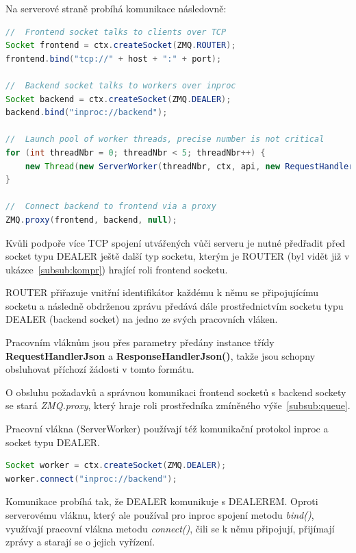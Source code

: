 \documentclass[thesis=M,czech]{FITthesis}[2014/05/07]
\begin{document}
Na serverové straně probíhá komunikace následovně: 

\begin{lstlisting}[language=java]
//  Frontend socket talks to clients over TCP
Socket frontend = ctx.createSocket(ZMQ.ROUTER);
frontend.bind("tcp://" + host + ":" + port);

//  Backend socket talks to workers over inproc
Socket backend = ctx.createSocket(ZMQ.DEALER);
backend.bind("inproc://backend");

//  Launch pool of worker threads, precise number is not critical
for (int threadNbr = 0; threadNbr < 5; threadNbr++) {
    new Thread(new ServerWorker(threadNbr, ctx, api, new RequestHandlerJson(), new ResponseHandlerJson())).start();
}

//  Connect backend to frontend via a proxy
ZMQ.proxy(frontend, backend, null);
\end{lstlisting}

Kvůli podpoře více TCP spojení utvářených vůči serveru je nutné předřadit před socket typu DEALER ještě další typ socketu, kterým je ROUTER (byl vidět již v ukázce~\ref{subsub:kompr}) hrající roli frontend socketu. 

ROUTER přiřazuje vnitřní identifikátor každému k němu se připojujícímu socketu a následně obdrženou zprávu předává dále prostřednictvím socketu typu DEALER (backend socket) na jedno ze svých pracovních vláken.

Pracovním vláknům jsou přes parametry předány instance třídy \textbf{RequestHandlerJson} a \textbf{ResponseHandlerJson()}, takže jsou schopny obsluhovat příchozí žádosti v tomto formátu.

O obsluhu požadavků a správnou komunikaci frontend socketů s backend sockety se stará \emph{ZMQ.proxy}, který hraje roli prostředníka zmíněného výše~\ref{subsub:queue}.

Pracovní vlákna (ServerWorker) používají též komunikační protokol inproc a socket typu DEALER.

\begin{lstlisting}[language=java]
Socket worker = ctx.createSocket(ZMQ.DEALER);
worker.connect("inproc://backend");
\end{lstlisting}

Komunikace probíhá tak, že DEALER komunikuje s DEALEREM. Oproti serverovému vláknu, který ale používal pro inproc spojení metodu \emph{bind()}, využívají pracovní vlákna metodu \emph{connect()}, čili se k němu připojují, přijímají zprávy a starají se o jejich vyřízení.
\end{document}
